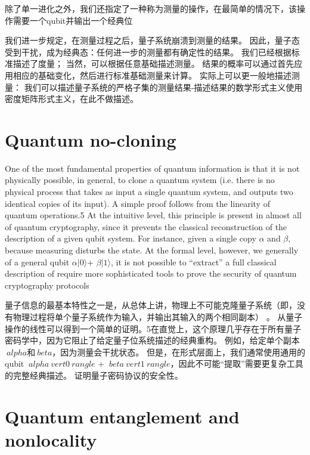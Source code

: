 除了单一进化之外，我们还指定了一种称为测量的操作，在最简单的情况下，该操作需要一个qubit并输出一个经典位

我们进一步规定，在测量过程之后，量子系统崩溃到测量的结果。 因此，量子态受到干扰，成为经典态：任何进一步的测量都有确定性的结果。 我们已经根据标准描述了度量； 当然，可以根据任意基础描述测量。 结果的概率可以通过首先应用相应的基础变化，然后进行标准基础测量来计算。 实际上可以更一般地描述测量： 我们可以描述量子系统的严格子集的测量结果-描述结果的数学形式主义使用密度矩阵形式主义，在此不做描述。\textcite{Broadbent2016}



\section{Quantum no-cloning}

One of the most fundamental properties of quantum information is that it is not physically possible, in general, to clone a quantum system  (i.e. there is no physical process that takes as input a single quantum system, and outputs two identical copies of its input). A simple proof follows from the linearity of quantum operations.5 At the intuitive level, this principle is present in almost all of quantum cryptography, since it prevents the classical reconstruction of the description of a given qubit system. For instance, given a single copy $\alpha$ and $\beta$, because measuring disturbs the state. At the formal level, however, we generally of a general qubit $\alpha\vert 0\rangle$+ $\beta\vert 1\rangle$, it is not possible to “extract” a full classical description of require more sophisticated tools to prove the security of quantum cryptography protocols

量子信息的最基本特性之一是，从总体上讲，物理上不可能克隆量子系统（即，没有物理过程将单个量子系统作为输入，并输出其输入的两个相同副本） 。 从量子操作的线性可以得到一个简单的证明。5在直觉上，这个原理几乎存在于所有量子密码学中，因为它阻止了给定量子位系统描述的经典重构。 例如，给定单个副本$ \ alpha $和$ \ beta $，因为测量会干扰状态。 但是，在形式层面上，我们通常使用通用的qubit $ \ alpha \ vert 0 \ rangle $ + $ \ beta \ vert 1 \ rangle $，因此不可能“提取”需要更复杂工具的完整经典描述。 证明量子密码协议的安全性。

\section{Quantum entanglement and nonlocality}

